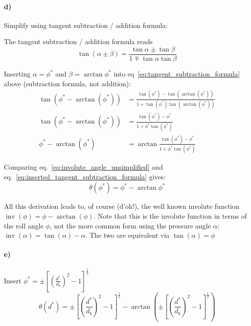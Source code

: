\paragraph{d)} Simplify using tangent subtraction / addition formula:

The tangent subtraction / addition formula reads
\begin{equation}
    \tan(\alpha \pm \beta) = \frac{\tan\alpha \pm \tan\beta}{1\mp\tan\alpha\tan{\beta}}
\label{eq:tangent_subtraction_formula}
\end{equation}

Inserting $\alpha=\phi^*$ and $\beta=\arctan\phi^*$ into eq~\eqref{eq:tangent_subtraction_formula} above (subtraction formula, not addition):
\begin{subequations}
\begin{align}
    \tan\left(\phi^* - \arctan(\phi^*)\right)   &= \frac{\tan(\phi^*) - \tan(\arctan(\phi^*))}{1+\tan(\phi^*)\tan(\arctan(\phi^*))} \\
    \tan\left(\phi^* - \arctan(\phi^*)\right)   &=        \frac{\tan(\phi^*) - \phi^*}{1 + \phi^*\tan(\phi^*)} \\
              \phi^* - \arctan(\phi^*)          &= \arctan\frac{\tan(\phi^*) - \phi^*}{1 + \phi^*\tan(\phi^*)}
\label{eq:inserted_tangent_subtraction_formula}
\end{align}
\end{subequations}

Comparing eq.~\eqref{eq:involute_angle_unsimplified} and eq.~\eqref{eq:inserted_tangent_subtraction_formula} gives:
\begin{equation}
    \theta(\phi^*) = \phi^* - \arctan\phi^*
\end{equation}

All this derivation leads to, of course (d'oh!), the well known involute function $\operatorname{inv}(\phi) = \phi - \arctan(\phi)$. Note that this is the involute function in terms of the roll angle $\phi$, not the more common form using the pressure angle $\alpha$: $\operatorname{inv}(\alpha)=\tan(\alpha)-\alpha$.
The two are equivalent via $\tan(\alpha) = \phi$

\paragraph{e)} Insert $\phi^* = \pm\left[\left(\frac{d^* }{d_b}\right)^2 - 1\right]^{\frac{1}{2}}$
\begin{equation}
    \theta(d^*) = \pm\left[\left(\frac{d^*}{d_b}\right)^2 - 1\right]^{\tfrac{1}{2}} - \arctan\left(\pm\left[\left(\frac{d^*}{d_b}\right)^2 - 1\right]^{\tfrac{1}{2}}\right)
\end{equation}

